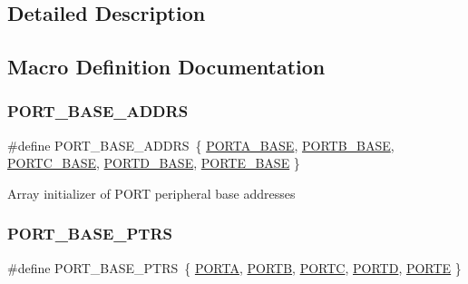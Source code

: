 \subsection{Detailed Description}


\subsection{Macro Definition Documentation}
\mbox{\label{group___p_o_r_t___peripheral___access___layer_ga80b01d00368494b63dd2a67eda52b241}} 
\subsubsection{\texorpdfstring{PORT\_BASE\_ADDRS}{PORT\_BASE\_ADDRS}}
{\footnotesize\ttfamily \#define P\+O\+R\+T\+\_\+\+B\+A\+S\+E\+\_\+\+A\+D\+D\+RS~\{ \mbox{\hyperlink{group___p_o_r_t___peripheral___access___layer_gae3d20f730f9619aabbf94e2efd1de34c}{P\+O\+R\+T\+A\+\_\+\+B\+A\+SE}}, \mbox{\hyperlink{group___p_o_r_t___peripheral___access___layer_ga2a668049a5e6c09cf6a7164ffca38a7e}{P\+O\+R\+T\+B\+\_\+\+B\+A\+SE}}, \mbox{\hyperlink{group___p_o_r_t___peripheral___access___layer_ga0018f0edf7f8030868f9cc791275378d}{P\+O\+R\+T\+C\+\_\+\+B\+A\+SE}}, \mbox{\hyperlink{group___p_o_r_t___peripheral___access___layer_gab88c980d0129f396683260eb978daf15}{P\+O\+R\+T\+D\+\_\+\+B\+A\+SE}}, \mbox{\hyperlink{group___p_o_r_t___peripheral___access___layer_ga72d490d67d751071845b3532193b4b93}{P\+O\+R\+T\+E\+\_\+\+B\+A\+SE}} \}}

Array initializer of P\+O\+RT peripheral base addresses \mbox{\label{group___p_o_r_t___peripheral___access___layer_ga54ff5179f8acaef2e1683cedfc0ef453}} 
\subsubsection{\texorpdfstring{PORT\_BASE\_PTRS}{PORT\_BASE\_PTRS}}
{\footnotesize\ttfamily \#define P\+O\+R\+T\+\_\+\+B\+A\+S\+E\+\_\+\+P\+T\+RS~\{ \mbox{\hyperlink{group___p_o_r_t___peripheral___access___layer_ga7c8a7f98a98d8cb125dd57a66720ab30}{P\+O\+R\+TA}}, \mbox{\hyperlink{group___p_o_r_t___peripheral___access___layer_ga09a0c85cd3da09d9cdf63a5ac4c39f77}{P\+O\+R\+TB}}, \mbox{\hyperlink{group___p_o_r_t___peripheral___access___layer_ga68fea88642279a70246e026e7221b0a5}{P\+O\+R\+TC}}, \mbox{\hyperlink{group___p_o_r_t___peripheral___access___layer_ga3e6a2517db4f9cb7c9037adf0aefe79b}{P\+O\+R\+TD}}, \mbox{\hyperlink{group___p_o_r_t___peripheral___access___layer_ga7e2386d3b1084b5b875ae3696f550ba9}{P\+O\+R\+TE}} \}}

